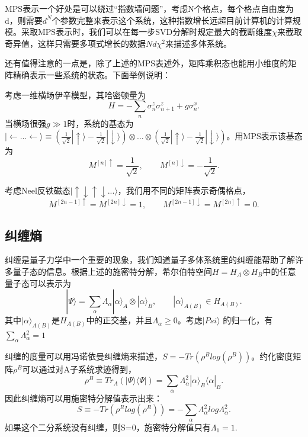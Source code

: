 \documentclass[12pt]{article}
\begin{document}
        MPS表示一个好处是可以绕过“指数墙问题”，考虑N个格点，每个格点自由度为d，则需要$d^N$个参数完整来表示这个系统，这种指数增长远超目前计算机的计算规模。采取MPS表示时，我们可以在每一步SVD分解时规定最大的截断维度$\chi$来截取奇异值，这样只需要多项式增长的数据$Nd\chi^2$来描述多体系统。
        
        还有值得注意的一点是，除了上述的MPS表述外，矩阵乘积态也能用小维度的矩阵精确表示一些系统的状态。下面举例说明：
        
        考虑一维横场伊辛模型，其哈密顿量为
        \begin{equation}H=-\sum_n\sigma_n^z\sigma_{n+1}^z+g\sigma_n^x.\end{equation}
        当横场很强$g\gg1$时，系统的基态为$|\gets...\gets\rangle\equiv(\frac{1}{\sqrt{2}}|\uparrow\rangle-\frac{1}{\sqrt{2}}|\downarrow\rangle)\otimes...\otimes(\frac{1}{\sqrt{2}}|\uparrow\rangle-\frac{1}{\sqrt{2}}|\downarrow\rangle)$。用MPS表示该基态为
        \begin{equation}M^{[n]\uparrow}=\frac{1}{\sqrt{2}},\qquad M^{[n]\downarrow}=-\frac{1}{\sqrt{2}}.\end{equation}
        
        考虑Neel反铁磁态$|\uparrow\downarrow\uparrow\downarrow...\rangle$，我们用不同的矩阵表示奇偶格点，
        \begin{equation}M^{[2n-1]\uparrow}=M^{[2n]\downarrow}=1, \qquad M^{[2n-1]\downarrow}=M^{[2n]\uparrow}=0.\end{equation}
	   
	   \subsection{纠缠熵}
	   纠缠是量子力学中一个重要的现象，我们知道量子多体系统里的纠缠能帮助了解许多量子态的信息。根据上述的施密特分解，希尔伯特空间$H=H_A\otimes H_B$中的任意量子态可以表示为\cite{hauschild2018efficient}
	   \begin{equation}|\Psi\rangle=\sum_\alpha \Lambda_\alpha|\alpha\rangle_A\otimes|\alpha\rangle_B, \qquad |\alpha\rangle_{A(B)}\in H_{A(B)}.\end{equation}
	   其中$|\alpha\rangle_{A(B)}$是$H_{A(B)}$中的正交基，并且$\Lambda_\alpha\geq0$。考虑$|Psi\rangle$ 的归一化，有$\sum_\alpha \Lambda_\alpha^2=1$
	   
	   纠缠的度量可以用冯诺依曼纠缠熵来描述，$S=-Tr(\rho^Blog(\rho^B))$。约化密度矩阵$\rho^B$可以通过对A子系统求迹得到，\begin{equation}\rho^B\equiv Tr_A(|\Psi\rangle\langle\Psi|)=\sum_\alpha\Lambda_\alpha^2|\alpha\rangle_B\langle\alpha|_B.\end{equation}
	   因此纠缠熵可以用施密特分解值表示出来：
	   \begin{equation}S\equiv-Tr(\rho^Rlog(\rho^R))=-\sum_\alpha\Lambda_\alpha^2log\Lambda_\alpha^2.\end{equation}
	   如果这个二分系统没有纠缠，则S=0，施密特分解值只有$\Lambda_1=1$.
	   
\end{document}
